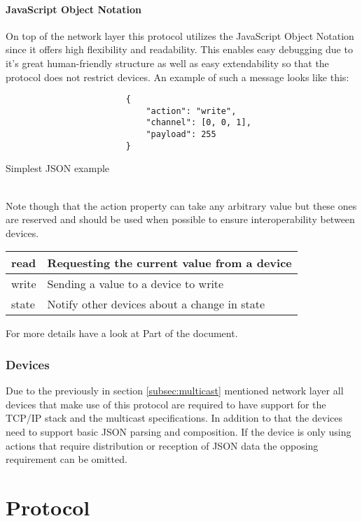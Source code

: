 \documentclass[11pt,a4paper, titlepage]{article}
\begin{document}
			\subsection[JSON]{JavaScript Object Notation}
				On top of the network layer this protocol utilizes the JavaScript Object Notation since it offers high flexibility and readability. This enables easy debugging due to it's great human-friendly structure as well as easy extendability so that the protocol does not restrict devices. An example of such a message looks like this:
				\begin{listing}
					\begin{verbatim}
						{
							"action": "write",
							"channel": [0, 0, 1],
							"payload": 255
						}
					\end{verbatim}
					\caption{Simplest JSON example}
					\label{SimplestJSON}
				\end{listing}
				\\
				Note though that the action property can take any arbitrary value but these ones are reserved and should be used when possible to ensure interoperability between devices.
				\begin{center}
					\def\arraystretch{2}
					\begin{tabular}{ l | l }	
						read & Requesting the current value from a device \\
						\hline
						write & Sending a value to a device to write \\
						\hline
						state & Notify other devices about a change in state
					\end{tabular}
				\end{center}
				For more details have a look at Part \ref{part:protocol} of the document.
		
		\section{Devices}
			Due to the previously in section \ref{subsec:multicast} mentioned network layer all devices that make use of this protocol are required to have support for the TCP/IP stack and the multicast specifications. In addition to that the devices need to support basic JSON parsing and composition. If the device is only using actions that require distribution or reception of JSON data the opposing requirement can be omitted.
	
	\part{Protocol}
		\label{part:protocol}
		
		
\end{document}
